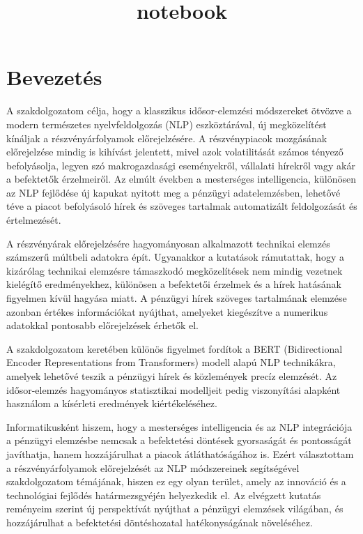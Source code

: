 \documentclass[11pt]{article}
\title{notebook}
\begin{document}
    
    \maketitle
    
    

    
    \section{Bevezetés}\label{bevezetuxe9s}

    A szakdolgozatom célja, hogy a klasszikus idősor-elemzési módszereket
ötvözve a modern természetes nyelvfeldolgozás (NLP) eszköztárával, új
megközelítést kínáljak a részvényárfolyamok előrejelzésére. A
részvénypiacok mozgásának előrejelzése mindig is kihívást jelentett,
mivel azok volatilitását számos tényező befolyásolja, legyen szó
makrogazdasági eseményekről, vállalati hírekről vagy akár a befektetők
érzelmeiről. Az elmúlt években a mesterséges intelligencia, különösen az
NLP fejlődése új kapukat nyitott meg a pénzügyi adatelemzésben, lehetővé
téve a piacot befolyásoló hírek és szöveges tartalmak automatizált
feldolgozását és értelmezését.

A részvényárak előrejelzésére hagyományosan alkalmazott technikai
elemzés számszerű múltbeli adatokra épít. Ugyanakkor a kutatások
rámutattak, hogy a kizárólag technikai elemzésre támaszkodó
megközelítések nem mindig vezetnek kielégítő eredményekhez, különösen a
befektetői érzelmek és a hírek hatásának figyelmen kívül hagyása miatt.
A pénzügyi hírek szöveges tartalmának elemzése azonban értékes
információkat nyújthat, amelyeket kiegészítve a numerikus adatokkal
pontosabb előrejelzések érhetők el.

A szakdolgozatom keretében különös figyelmet fordítok a BERT
(Bidirectional Encoder Representations from Transformers) modell alapú
NLP technikákra, amelyek lehetővé teszik a pénzügyi hírek és közlemények
precíz elemzését. Az idősor-elemzés hagyományos statisztikai modelljeit
pedig viszonyítási alapként használom a kísérleti eredmények
kiértékeléséhez.

Informatikusként hiszem, hogy a mesterséges intelligencia és az NLP
integrációja a pénzügyi elemzésbe nemcsak a befektetési döntések
gyorsaságát és pontosságát javíthatja, hanem hozzájárulhat a piacok
átláthatóságához is. Ezért választottam a részvényárfolyamok
előrejelzését az NLP módszereinek segítségével szakdolgozatom témájának,
hiszen ez egy olyan terület, amely az innováció és a technológiai
fejlődés határmezsgyéjén helyezkedik el. Az elvégzett kutatás reményeim
szerint új perspektívát nyújthat a pénzügyi elemzések világában, és
hozzájárulhat a befektetési döntéshozatal hatékonyságának növeléséhez.
\end{document}
